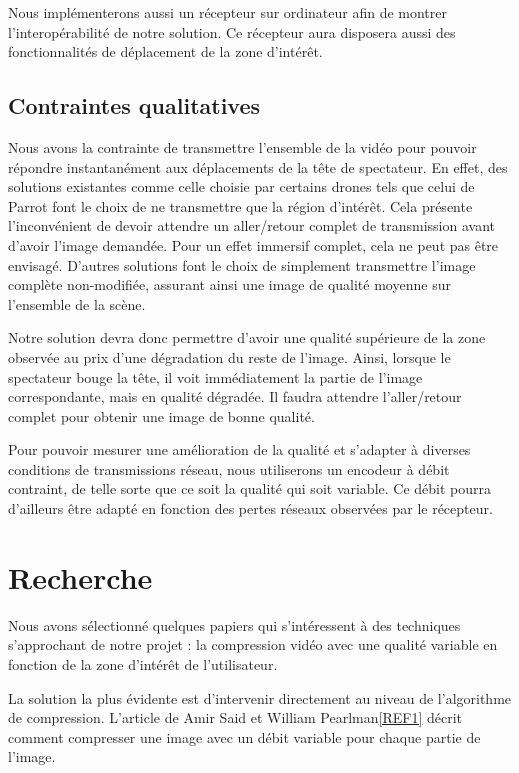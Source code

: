 \documentclass[11pt,a4paper]{article}
\begin{document}
\bigbreak
Nous implémenterons aussi un récepteur sur ordinateur afin de montrer l'interopérabilité de notre solution.
Ce récepteur aura disposera aussi des fonctionnalités de déplacement de la zone d'intérêt.

\subsection{Contraintes qualitatives}

Nous avons la contrainte de transmettre l’ensemble de la vidéo pour pouvoir répondre instantanément aux déplacements de la tête de spectateur.
En effet, des solutions existantes comme celle choisie par certains drones tels que celui de Parrot font le choix de ne transmettre que la région d’intérêt. Cela présente l’inconvénient de devoir attendre un aller/retour complet de transmission avant d’avoir l’image demandée. Pour un effet immersif complet, cela ne peut pas être envisagé.
D’autres solutions font le choix de simplement transmettre l’image complète non-modifiée, assurant ainsi une image de qualité moyenne sur l’ensemble de la scène.

\bigbreak
Notre solution devra donc permettre d’avoir une qualité supérieure de la zone observée au prix d’une dégradation du reste de l’image.
Ainsi, lorsque le spectateur bouge la tête, il voit immédiatement la partie de l’image correspondante, mais en qualité dégradée. Il faudra attendre l’aller/retour complet pour obtenir une image de bonne qualité.

\bigbreak
Pour pouvoir mesurer une amélioration de la qualité et s’adapter à diverses conditions de transmissions réseau, nous utiliserons un encodeur à débit contraint, de telle sorte que ce soit la qualité qui soit variable.
Ce débit pourra d’ailleurs être adapté en fonction des pertes réseaux observées par le récepteur.


\section{Recherche}

Nous avons sélectionné quelques papiers qui s'intéressent à des techniques s'approchant de notre projet : la compression vidéo avec une qualité variable en fonction de la zone d'intérêt de l'utilisateur.

\bigbreak
La solution la plus évidente est d'intervenir directement au niveau de l'algorithme de compression.
L'article de Amir Said et William Pearlman\ref{REF1} décrit comment compresser une image avec un débit variable pour chaque partie de l'image.
\end{document}
